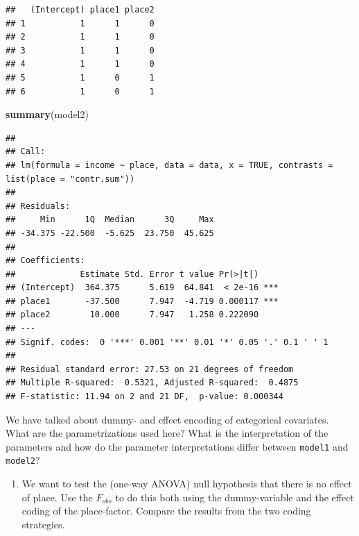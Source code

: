 \documentclass[
]{article}
\newenvironment{Shaded}{\begin{snugshade}}{\end{snugshade}}
\newcommand{\AttributeTok}[1]{\textcolor[rgb]{0.13,0.29,0.53}{#1}}
\newcommand{\ConstantTok}[1]{\textcolor[rgb]{0.56,0.35,0.01}{#1}}
\newcommand{\FunctionTok}[1]{\textcolor[rgb]{0.13,0.29,0.53}{\textbf{#1}}}
\newcommand{\NormalTok}[1]{#1}
\newcommand{\OtherTok}[1]{\textcolor[rgb]{0.56,0.35,0.01}{#1}}
\newcommand{\SpecialCharTok}[1]{\textcolor[rgb]{0.81,0.36,0.00}{\textbf{#1}}}
\newcommand{\StringTok}[1]{\textcolor[rgb]{0.31,0.60,0.02}{#1}}
\providecommand{\tightlist}{%
  \setlength{\itemsep}{0pt}\setlength{\parskip}{0pt}}
\begin{document}
\begin{Shaded}
\end{Shaded}

\begin{verbatim}
##   (Intercept) place1 place2
## 1           1      1      0
## 2           1      1      0
## 3           1      1      0
## 4           1      1      0
## 5           1      0      1
## 6           1      0      1
\end{verbatim}

\begin{Shaded}
\begin{Highlighting}[]
\FunctionTok{summary}\NormalTok{(model2)}
\end{Highlighting}
\end{Shaded}

\begin{verbatim}
## 
## Call:
## lm(formula = income ~ place, data = data, x = TRUE, contrasts = list(place = "contr.sum"))
## 
## Residuals:
##     Min      1Q  Median      3Q     Max 
## -34.375 -22.500  -5.625  23.750  45.625 
## 
## Coefficients:
##             Estimate Std. Error t value Pr(>|t|)    
## (Intercept)  364.375      5.619  64.841  < 2e-16 ***
## place1       -37.500      7.947  -4.719 0.000117 ***
## place2        10.000      7.947   1.258 0.222090    
## ---
## Signif. codes:  0 '***' 0.001 '**' 0.01 '*' 0.05 '.' 0.1 ' ' 1
## 
## Residual standard error: 27.53 on 21 degrees of freedom
## Multiple R-squared:  0.5321, Adjusted R-squared:  0.4875 
## F-statistic: 11.94 on 2 and 21 DF,  p-value: 0.000344
\end{verbatim}

We have talked about dummy- and effect encoding of categorical
covariates. What are the parametrizations used here? What is the
interpretation of the parameters and how do the parameter
interpretations differ between \texttt{model1} and \texttt{model2}?

\begin{enumerate}
\def\labelenumi{\arabic{enumi}.}
\setcounter{enumi}{3}
\tightlist
\item
  We want to test the (one-way ANOVA) null hypothesis that there is no
  effect of place. Use the \(F_{obs}\) to do this both using the
  dummy-variable and the effect coding of the place-factor. Compare the
  results from the two coding strategies.
\end{enumerate}
\end{document}
